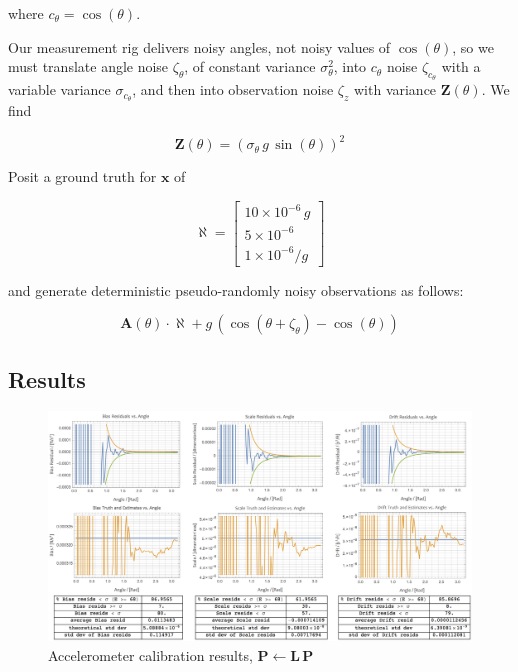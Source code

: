 \documentclass[10pt,oneside,x11names]{article}
\begin{document}
\noindent where \(c_\theta=\cos(\theta)\). 

Our measurement rig delivers noisy angles, not noisy values of \(\cos(\theta)\),
so we must translate angle noise \(\zeta_\theta\), of constant variance
\(\sigma_\theta^2\), into \(c_\theta\) noise \(\zeta_{c_\theta}\) with a variable
variance \(\sigma_{c_\theta}\), and then into observation noise \(\zeta_z\) with
variance \(\mathbold{Z}(\theta)\). We find

\begin{equation}
\mathbold{Z}(\theta) = \left(\sigma_\theta\,g\,\sin(\theta)\right)^2 
\end{equation}

Posit a ground truth for \(\mathbold{x}\) of 

\begin{equation}
\mathbold{\aleph} =
\begin{bmatrix}
10\times{10^{-6}}\,g \\
5\times{10^{-6}}\\
1\times{10^{-6}}/g
\end{bmatrix}
\end{equation}

\noindent and generate deterministic pseudo-randomly noisy observations as
follows:

\begin{equation}
\mathbold{A}(\theta)\cdot\aleph + g\,(\cos(\theta + \zeta_\theta) -\cos(\theta))
\end{equation}

\subsection{Results}
\label{sec:orgheadline24}

\begin{figure}[htb]
\centering
\includegraphics[width=.9\linewidth]{zarchan_musoff_1.png}
\caption{\label{fig:orgparagraph3}
Accelerometer calibration results, \(\mathbold{P}\leftarrow\mathbold{L}\,\mathbold{P}\)}
\end{figure}
\end{document}
